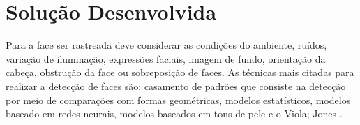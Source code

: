 \section{Solução Desenvolvida}\label{sec:solucao-desenvolvida}

Para a face ser rastreada deve considerar as condições do ambiente, ruídos, variação de iluminação, expressões faciais, imagem de fundo, orientação da cabeça, obstrução da face ou sobreposição de faces.
As técnicas mais citadas para realizar a detecção de faces são: casamento de padrões que consiste na detecção por meio de comparações com formas geométricas, modelos estatísticos, modelos baseado em redes neurais, modelos baseados em tons de pele e o
Viola; Jones \cite{refer3}.

